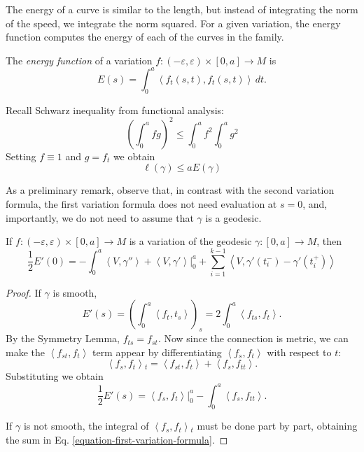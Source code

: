 \noindent
The energy of a curve is similar
to the length, but instead of integrating
the norm of the speed,
we integrate the norm squared.
For a given variation, the energy
function computes the energy of each of
the curves in the family.

\begin{definition}
\label{definition-energy}
The {\it energy function} of a variation
$f:(-\varepsilon,\varepsilon)\times[0,a]\to
M$ is
$$
E(s)=\int_0^a\left\langle{}f_t(s,t),f_t(s,t)\right\rangle{}\,dt.
$$
\end{definition}

\noindent
Recall Schwarz inequality from functional
analysis:
$$
\left(\int_0^afg\right)^2\leq
\int_0^af^2\int_0^ag^2
$$
Setting $f\equiv1$ and $g=f_t$ we obtain
\begin{equation}
\label{equation-energy-bounds-length}
\ell(\gamma)\leq aE(\gamma)
\end{equation}

\medskip\noindent
As a preliminary remark, observe that,
in contrast with the second variation
formula, the first variation formula
does not need evaluation at $s=0$,
and, importantly, we do not need to assume
that $\gamma$ is a geodesic.

\begin{theorem}
\label{theorem-first-variation-formula}
If  $f:(-\varepsilon,\varepsilon)\times[0,a]
\to M$ is a variation of
the geodesic $\gamma:[0,a]\to M$, then
\begin{equation}
\label{equation-first-variation-formula}
\frac{1}{2}E'(0)=-\int_0^a\left\langle{}V,
\gamma''\right\rangle{}+\left\langle{}V,\gamma'\right\rangle{}|_{0}^a
+\sum_{i=1}^{k-1}\left\langle{}V,\gamma'(t_{i}^-)-
\gamma'(t_i^+)\right\rangle{}
\end{equation}
\end{theorem}

\begin{proof}
If $\gamma$ is smooth,
$$
E'(s)=
\left(\int_0^a\left\langle{}f_t,t_s\right\rangle{}\right)_s
=2\int_0^a\left\langle{}f_{ts},f_t\right\rangle{}.
$$
By the Symmetry Lemma,
$f_{ts}=f_{st}$.
Now since the connection is metric,
we can make the $\left\langle{}f_{st},f_t\right\rangle{}$
term appear by differentiating
$\left\langle{}f_s,f_t\right\rangle{}$
with respect to $t$:
$$
\left\langle{}f_s,f_t\right\rangle{}_t=\left\langle{}f_{st},
f_t\right\rangle{}+\left\langle{}f_s,f_{tt}\right\rangle{}.
$$
Substituting we obtain
$$
\frac{1}{2}E'(s)
=\left\langle{}f_s,f_t\right\rangle{}|_0^a
-\int_0^a\left\langle{}f_s,f_{tt}\right\rangle{}.
$$

If $\gamma$ is not smooth, the integral of
$\left\langle{}f_s,f_t\right\rangle{}_t$ must be
done part by part, obtaining the sum in Eq.
\ref{equation-first-variation-formula}.
\end{proof}

